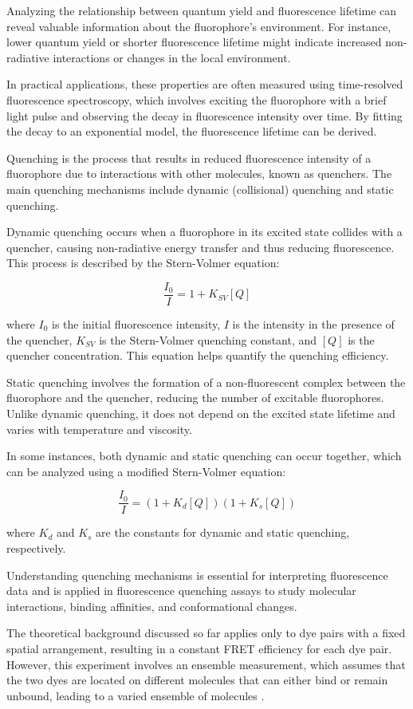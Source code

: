 \documentclass[a4paper,english,12pt,bibliography=totoc]{scrreprt}
\begin{document}
Analyzing the relationship between quantum yield and fluorescence lifetime can reveal valuable information about the fluorophore's environment. For instance, lower quantum yield or shorter fluorescence lifetime might indicate increased non-radiative interactions or changes in the local environment.

In practical applications, these properties are often measured using time-resolved fluorescence spectroscopy, which involves exciting the fluorophore with a brief light pulse and observing the decay in fluorescence intensity over time. By fitting the decay to an exponential model, the fluorescence lifetime can be derived.

Quenching is the process that results in reduced fluorescence intensity of a fluorophore due to interactions with other molecules, known as quenchers. The main quenching mechanisms include dynamic (collisional) quenching and static quenching.

Dynamic quenching occurs when a fluorophore in its excited state collides with a quencher, causing non-radiative energy transfer and thus reducing fluorescence. This process is described by the Stern-Volmer equation:

\[
\frac{I_0}{I} = 1 + K_{SV}[Q]
\]

where $I_0$ is the initial fluorescence intensity, $I$ is the intensity in the presence of the quencher, $K_{SV}$ is the Stern-Volmer quenching constant, and $[Q]$ is the quencher concentration. This equation helps quantify the quenching efficiency.

Static quenching involves the formation of a non-fluorescent complex between the fluorophore and the quencher, reducing the number of excitable fluorophores. Unlike dynamic quenching, it does not depend on the excited state lifetime and varies with temperature and viscosity.

In some instances, both dynamic and static quenching can occur together, which can be analyzed using a modified Stern-Volmer equation:

\[
\frac{I_0}{I} = (1 + K_d[Q])(1 + K_s[Q])
\]

where $K_d$ and $K_s$ are the constants for dynamic and static quenching, respectively.

Understanding quenching mechanisms is essential for interpreting fluorescence data and is applied in fluorescence quenching assays to study molecular interactions, binding affinities, and conformational changes.


The theoretical background discussed so far applies only to dye pairs with a fixed spatial arrangement, resulting in a constant FRET efficiency for each dye pair. However, this experiment involves an ensemble measurement, which assumes that the two dyes are located on different molecules that can either bind or remain unbound, leading to a varied ensemble of molecules .
\end{document}
